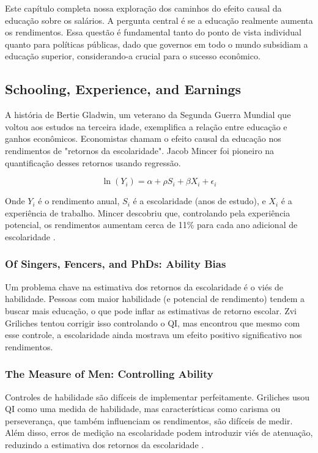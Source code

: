 \documentclass[a4paper,12pt]{article}[abntex2]
\begin{document}
Este capítulo completa nossa exploração dos caminhos do efeito causal da educação sobre os salários. A pergunta central é se a educação realmente aumenta os rendimentos. Essa questão é fundamental tanto do ponto de vista individual quanto para políticas públicas, dado que governos em todo o mundo subsidiam a educação superior, considerando-a crucial para o sucesso econômico.

\subsection{Schooling, Experience, and Earnings}

A história de Bertie Gladwin, um veterano da Segunda Guerra Mundial que voltou aos estudos na terceira idade, exemplifica a relação entre educação e ganhos econômicos. Economistas chamam o efeito causal da educação nos rendimentos de "retornos da escolaridade". Jacob Mincer foi pioneiro na quantificação desses retornos usando regressão.

\begin{equation}
    \ln(Y_i) = \alpha + \rho S_i + \beta X_i + \epsilon_i
\end{equation}

Onde \(Y_i\) é o rendimento anual, \(S_i\) é a escolaridade (anos de estudo), e \(X_i\) é a experiência de trabalho. Mincer descobriu que, controlando pela experiência potencial, os rendimentos aumentam cerca de 11\% para cada ano adicional de escolaridade  .

\subsubsection*{Of Singers, Fencers, and PhDs: Ability Bias}

Um problema chave na estimativa dos retornos da escolaridade é o viés de habilidade. Pessoas com maior habilidade (e potencial de rendimento) tendem a buscar mais educação, o que pode inflar as estimativas de retorno escolar. Zvi Griliches tentou corrigir isso controlando o QI, mas encontrou que mesmo com esse controle, a escolaridade ainda mostrava um efeito positivo significativo nos rendimentos.

\subsubsection*{The Measure of Men: Controlling Ability}

Controles de habilidade são difíceis de implementar perfeitamente. Griliches usou QI como uma medida de habilidade, mas características como carisma ou perseverança, que também influenciam os rendimentos, são difíceis de medir. Além disso, erros de medição na escolaridade podem introduzir viés de atenuação, reduzindo a estimativa dos retornos da escolaridade  .
\end{document}
